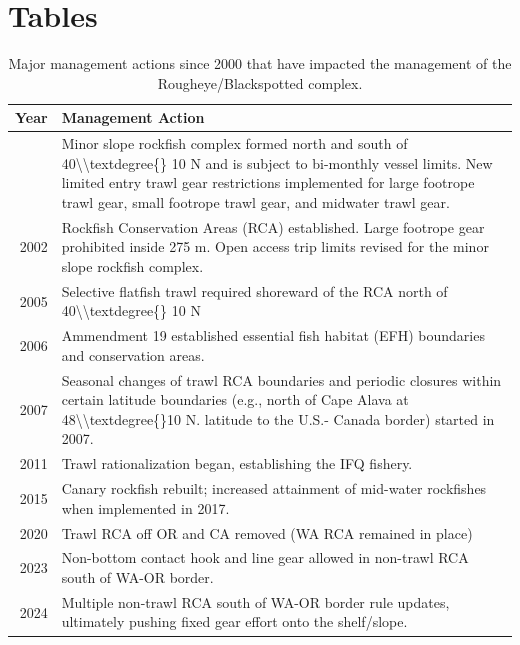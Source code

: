 \documentclass[
]{scrartcl}
\begin{document}
\newpage{}

\section{Tables}\label{tables}

\begingroup
\fontsize{9.0pt}{10.8pt}\selectfont

\begin{longtable}{r>{\raggedright\arraybackslash}p{\dimexpr 300.00pt -2\tabcolsep-1.5\arrayrulewidth}}

\caption{\label{tbl-management_summary}Major management actions since
2000 that have impacted the management of the Rougheye/Blackspotted
complex.}

\tabularnewline

\toprule
Year & Management Action \\ 
\midrule\addlinespace[2.5pt]
2000 & Minor slope rockfish complex formed north and south of 40\textbackslash{}\textbackslash{}textdegree\{\} 10 N and is subject to bi-monthly vessel limits. New limited entry trawl gear restrictions implemented for large footrope trawl gear, small footrope trawl gear, and midwater trawl gear. \\ 
2002 & Rockfish Conservation Areas (RCA) established. Large footrope gear prohibited inside 275 m. Open access trip limits revised for the minor slope rockfish complex. \\ 
2005 & Selective flatfish trawl required shoreward of the RCA north of 40\textbackslash{}\textbackslash{}textdegree\{\} 10 N \\ 
2006 & Ammendment 19 established essential fish habitat (EFH) boundaries and conservation areas. \\ 
2007 & Seasonal changes of trawl RCA boundaries and periodic closures within certain latitude boundaries (e.g., north of Cape Alava at 48\textbackslash{}\textbackslash{}textdegree\{\}10 N. latitude to the U.S.- Canada border) started in 2007. \\ 
2011 & Trawl rationalization began, establishing the IFQ fishery. \\ 
2015 & Canary rockfish rebuilt; increased attainment of mid-water rockfishes when implemented in 2017.  \\ 
2020 & Trawl RCA off OR and CA removed (WA RCA remained in place) \\ 
2023 & Non-bottom contact hook and line gear allowed in non-trawl RCA south of WA-OR border. \\ 
2024 & Multiple non-trawl RCA south of WA-OR border rule updates, ultimately pushing fixed gear effort onto the shelf/slope.  \\ 
\bottomrule

\end{longtable}
\end{document}
